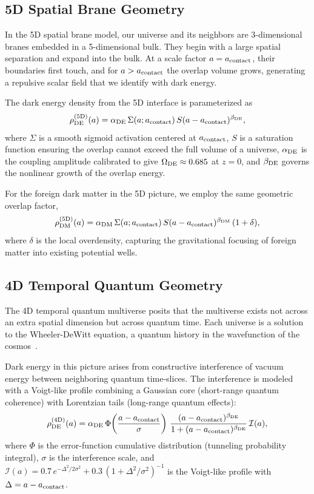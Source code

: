 \documentclass[12pt]{article}
\begin{document}
\subsection{5D Spatial Brane Geometry}

In the 5D spatial brane model, our universe and its neighbors are 3-dimensional branes embedded in a 5-dimensional bulk. They begin with a large spatial separation and expand into the bulk. At a scale factor $a = a_{\rm contact}$, their boundaries first touch, and for $a > a_{\rm contact}$ the overlap volume grows, generating a repulsive scalar field that we identify with dark energy.

The dark energy density from the 5D interface is parameterized as
\begin{equation}
\rho_{\rm DE}^{\rm (5D)}(a) = \alpha_{\rm DE} \, \Sigma(a; a_{\rm contact}) \, S(a-a_{\rm contact})^{\beta_{\rm DE}},
\label{eq:de_5d}
\end{equation}
where $\Sigma$ is a smooth sigmoid activation centered at $a_{\rm contact}$, $S$ is a saturation function ensuring the overlap cannot exceed the full volume of a universe, $\alpha_{\rm DE}$ is the coupling amplitude calibrated to give $\Omega_{\rm DE} \approx 0.685$ at $z=0$, and $\beta_{\rm DE}$ governs the nonlinear growth of the overlap energy.

For the foreign dark matter in the 5D picture, we employ the same geometric overlap factor,
\begin{equation}
\rho_{\rm DM}^{\rm (5D)}(a) = \alpha_{\rm DM} \, \Sigma(a; a_{\rm contact}) \, S(a-a_{\rm contact})^{\beta_{\rm DM}} \, (1 + \delta),
\label{eq:dm_5d}
\end{equation}
where $\delta$ is the local overdensity, capturing the gravitational focusing of foreign matter into existing potential wells.

\subsection{4D Temporal Quantum Geometry}

The 4D temporal quantum multiverse posits that the multiverse exists not across an extra spatial dimension but across quantum time. Each universe is a solution to the Wheeler-DeWitt equation, a quantum history in the wavefunction of the cosmos~\cite{singh2025}.

Dark energy in this picture arises from constructive interference of vacuum energy between neighboring quantum time-slices. The interference is modeled with a Voigt-like profile combining a Gaussian core (short-range quantum coherence) with Lorentzian tails (long-range quantum effects):
\begin{equation}
\rho_{\rm DE}^{\rm (4D)}(a) = \alpha_{\rm DE} \, \Phi\!\left(\frac{a-a_{\rm contact}}{\sigma}\right) \, \frac{(a-a_{\rm contact})^{\beta_{\rm DE}}}{1 + (a-a_{\rm contact})^{\beta_{\rm DE}}} \, \mathcal{I}(a),
\label{eq:de_4d}
\end{equation}
where $\Phi$ is the error-function cumulative distribution (tunneling probability integral), $\sigma$ is the interference scale, and $\mathcal{I}(a) = 0.7\,e^{-\Delta^2/2\sigma^2} + 0.3\,(1+\Delta^2/\sigma^2)^{-1}$ is the Voigt-like profile with $\Delta = a-a_{\rm contact}$.
\end{document}
